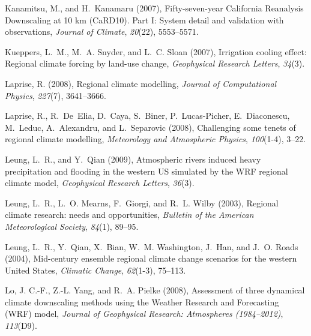 \documentclass[draft,ms]{agutex}   %
\begin{document}
\begin{article}
\begin{thebibliography}{72}
Kanamitsu, M., and H.~Kanamaru (2007), {Fifty-seven-year California Reanalysis
  Downscaling at 10 km (CaRD10). Part I: System detail and validation with
  observations}, \textit{Journal of Climate}, \textit{20}(22), 5553--5571.

Kueppers, L.~M., M.~A. Snyder, and L.~C. Sloan (2007), Irrigation cooling
  effect: Regional climate forcing by land-use change, \textit{Geophysical
  Research Letters}, \textit{34}(3).

Laprise, R. (2008), Regional climate modelling, \textit{Journal of
  Computational Physics}, \textit{227}(7), 3641--3666.

Laprise, R., R.~De~Elia, D.~Caya, S.~Biner, P.~Lucas-Picher, E.~Diaconescu,
  M.~Leduc, A.~Alexandru, and L.~Separovic (2008), Challenging some tenets of
  regional climate modelling, \textit{Meteorology and Atmospheric Physics},
  \textit{100}(1-4), 3--22.

Leung, L.~R., and Y.~Qian (2009), {Atmospheric rivers induced heavy
  precipitation and flooding in the western US simulated by the WRF regional
  climate model}, \textit{Geophysical Research Letters}, \textit{36}(3).

Leung, L.~R., L.~O. Mearns, F.~Giorgi, and R.~L. Wilby (2003), Regional climate
  research: needs and opportunities, \textit{Bulletin of the American
  Meteorological Society}, \textit{84}(1), 89--95.

Leung, L.~R., Y.~Qian, X.~Bian, W.~M. Washington, J.~Han, and J.~O. Roads
  (2004), {Mid-century ensemble regional climate change scenarios for the
  western United States}, \textit{Climatic Change}, \textit{62}(1-3), 75--113.

Lo, J. C.-F., Z.-L. Yang, and R.~A. Pielke (2008), {Assessment of three
  dynamical climate downscaling methods using the Weather Research and
  Forecasting (WRF) model}, \textit{Journal of Geophysical Research:
  Atmospheres (1984--2012)}, \textit{113}(D9).


\end{thebibliography}
\end{article}
\end{document}
